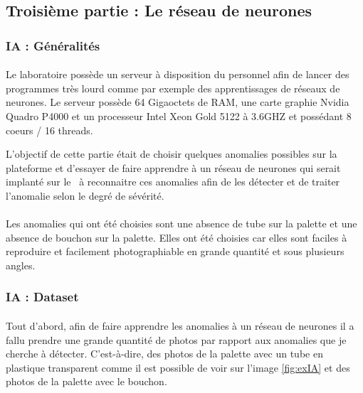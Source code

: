 \subsection{Troisième partie : Le réseau de neurones}
    \subsubsection{IA : Généralités}
        \paragraph*{}
        Le laboratoire possède un serveur à disposition du personnel afin de lancer des programmes très lourd comme par exemple des apprentissages de réseaux de neurones. Le serveur possède 64 Gigaoctets de RAM, une carte graphie Nvidia Quadro P4000 et un processeur Intel Xeon Gold 5122 à 3.6GHZ et possédant 8 coeurs / 16 threads.
        
        L'objectif de cette partie était de choisir quelques anomalies possibles sur la plateforme et d'essayer de faire apprendre à un réseau de neurones qui serait implanté sur le \rpi ~à reconnaitre ces anomalies afin de les détecter et de traiter l'anomalie selon le degré de sévérité.
        
        \paragraph*{}
        Les anomalies qui ont été choisies sont une absence de tube sur la palette et une absence de bouchon sur la palette. Elles ont été choisies car elles sont faciles à reproduire et facilement photographiable en grande quantité et sous plusieurs angles.
        
        
    \subsubsection{IA : Dataset}
        \paragraph*{}
        Tout d'abord, afin de faire apprendre les anomalies à un réseau de neurones il a fallu prendre une grande quantité de photos par rapport aux anomalies que je cherche à détecter. C'est-à-dire, des photos de la palette avec un tube en plastique transparent comme il est possible de voir sur l'image \ref{fig:exIA} et des photos de la palette avec le bouchon.
        
